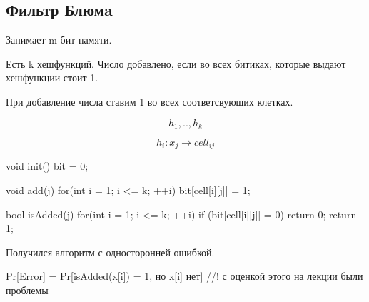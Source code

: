 \subsection{Фильтр Блюмa}

Занимает m бит памяти. 

Есть k хешфункций. Число добавлено, если во всех битиках, которые выдают
хешфункции стоит 1.

При добавление числа ставим 1 во всех соответсвующих клетках.  

$$h_1,..,h_k$$

$$h_i \colon x_j \rightarrow cell_{ij}$$

\begin{cppcode}
void init() {
    bit = {0};
}

void add(j) {
    for(int i = 1; i <= k; ++i) {
         bit[cell[i][j]] = 1;
    }
}

bool isAdded(j) {
    for(int i = 1; i <= k; ++i) {
         if (bit[cell[i][j]] = 0) { 
             return 0;
         }
     }
     return 1;
}
\end{cppcode}

Получился алгоритм с односторонней ошибкой.

Pr[Error] = Pr[isAdded(x[i]) = 1, но x[i] нет] //! с оценкой этого на лекции были проблемы 

